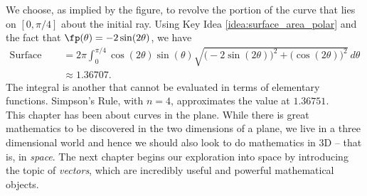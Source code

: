 {
We choose, as implied by the figure, to revolve the portion of the curve that lies on $[0,\pi/4]$ about the initial ray. Using Key Idea \ref{idea:surface_area_polar} and the fact that $\fp(\theta) = -2\sin(2\theta)$, we have
\begin{align*}
\text{Surface Area} &= 2\pi\int_0^{\pi/4} \cos(2\theta)\sin(\theta)\sqrt{\big(-2\sin(2\theta)\big)^2+\big(\cos(2\theta)\big)^2}\ d\theta \\
&\approx 1.36707.
\end{align*}
The integral is another that cannot be evaluated in terms of elementary functions. Simpson's Rule, with $n=4$, approximates the value at $1.36751$.%
}\\


This chapter has been about curves in the plane. While there is great mathematics to be discovered in the two dimensions of a plane, we live in a three dimensional world and hence we should also look to do mathematics in 3D -- that is, in \emph{space}. The next chapter begins our exploration into space by introducing the topic of \emph{vectors}, which are incredibly useful and powerful mathematical objects.
